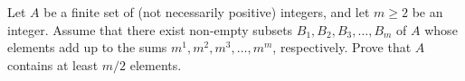 Let $A$ be a finite set of (not necessarily positive) integers, and let $m \geq 2$ be an integer. Assume that there exist non-empty subsets $B_1,B_2,B_3,\ldots,B_m$ of $A$ whose elements add up to the sums $m^1,m^2,m^3,\ldots,m^m$, respectively. Prove that $A$ contains at least $m/2$ elements.
